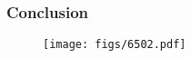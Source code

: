 \begin{frame}

  \frametitle{Conclusion}
  
  \begin{figure}
    \centering
    \texttt{[image: figs/6502.pdf]}
  \end{figure}

\end{frame}
